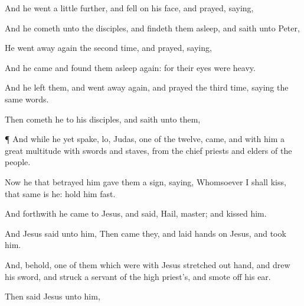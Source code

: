 {And he
went a little
further, and
fell
on
his
face, and
prayed,
saying,
{}

And he
cometh
unto the
disciples,
and
findeth
them
asleep,
and
saith unto
Peter,
{}


He went
away
again the second
time, and
prayed,
saying,
{}

And he
came and
found
them
asleep
again:
for
their
eyes
were
heavy.

And he
left
them, and went
away
again, and
prayed the third
time,
saying
the
same
words.

Then cometh
he
to
his
disciples,
and
saith unto
them,
{}



\par }{\PP {}¶
And
while
he
yet
spake,
lo,
Judas,
one of the
twelve,
came,
and
with
him
a
great
multitude
with
swords
and
staves,
from the chief
priests
and
elders of the
people.

Now he that
betrayed
him
gave
them a
sign,
saying,
Whomsoever I shall
kiss, that
same is
he:
hold
him
fast.

And
forthwith he came
to
Jesus, and
said,
Hail,
master;
and
kissed
him.

And
Jesus
said unto
him,
{}
Then came they, and
laid
hands
on
Jesus,
and
took
him.

And,
behold,
one of them which
were
with
Jesus stretched
out
{}
hand, and
drew
his
sword,
and
struck a
servant of the high
priest’s, and smote
off
his
ear.

Then
said
Jesus unto
him,
{}


}
